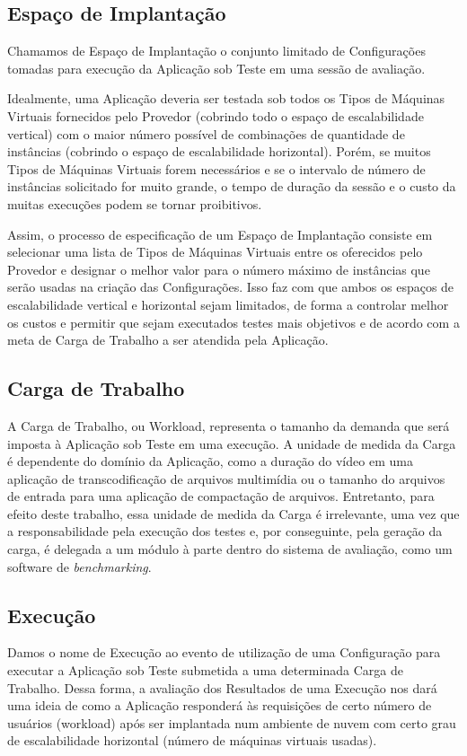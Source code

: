 \subsection{Espaço de Implantação}
Chamamos de Espaço de Implantação o conjunto limitado de Configurações tomadas 
para execução da Aplicação sob Teste em uma sessão de avaliação.
 
Idealmente, uma Aplicação deveria ser testada sob todos os Tipos de Máquinas 
Virtuais fornecidos pelo Provedor (cobrindo todo o espaço de escalabilidade 
vertical) com o maior número possível de combinações de quantidade de instâncias 
(cobrindo o espaço de escalabilidade horizontal). Porém, se muitos Tipos de 
Máquinas Virtuais forem necessários e se o intervalo de número de instâncias 
solicitado for muito grande, o tempo de duração da sessão e o custo da muitas 
execuções podem se tornar proibitivos.

Assim, o processo de especificação de um Espaço de Implantação consiste em 
selecionar uma lista de Tipos de Máquinas Virtuais entre os oferecidos pelo 
Provedor e designar o melhor valor para o número máximo de instâncias que serão 
usadas na criação das Configurações. Isso faz com que ambos os espaços de 
escalabilidade vertical e horizontal sejam limitados, de forma a controlar 
melhor os custos e permitir que sejam executados testes mais objetivos e de 
acordo com a meta de Carga de Trabalho a ser atendida pela Aplicação.

\subsection{Carga de Trabalho}
A Carga de Trabalho, ou Workload, representa o tamanho da demanda que será 
imposta à Aplicação sob Teste em uma execução. A unidade de medida da Carga é 
dependente do domínio da Aplicação, como a duração do vídeo em uma aplicação
de transcodificação de arquivos multimídia ou o tamanho do arquivos de entrada
para uma aplicação de compactação de arquivos. Entretanto, para efeito deste 
trabalho, essa unidade de medida da Carga é irrelevante, uma vez que a 
responsabilidade pela execução dos testes e, por conseguinte, pela geração da 
carga, é delegada a um módulo à parte dentro do sistema de avaliação, como um
software de \emph{benchmarking}.

\subsection{Execução}
Damos o nome de Execução ao evento de utilização de uma Configuração para 
executar a Aplicação sob Teste submetida a uma determinada Carga de Trabalho. 
Dessa forma, a avaliação dos Resultados de uma Execução nos dará uma ideia de 
como a Aplicação responderá às requisições de certo número de usuários (workload) 
após ser implantada num ambiente de nuvem com certo grau de escalabilidade 
horizontal (número de máquinas virtuais usadas). 


